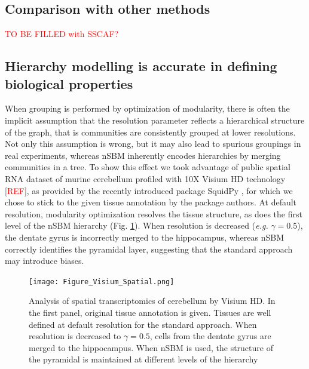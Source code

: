 \documentclass[10pt]{article}
\begin{document}
\subsection*{Comparison with other methods}

\textcolor{red}{TO BE FILLED with SSCAF?}


\subsection*{Hierarchy modelling is accurate in defining biological properties}

When grouping is performed by optimization of modularity, there is often the implicit assumption that the resolution parameter reflects a hierarchical structure of the graph, that is communities are consistently grouped at lower resolutions. Not only this assumption is wrong, but it may also lead to spurious groupings in real experiments, whereas nSBM inherently encodes hierarchies by merging communities in a tree. To show this effect we took advantage of public spatial RNA dataset of murine cerebellum profiled with 10X Visium HD technology [\textcolor{red}{REF}], as provided by the recently introduced package SquidPy \cite{Palla_Theis_2021}, for which we chose to stick to the given tissue annotation by the package authors. At default resolution, modularity optimization resolves the tissue structure, as does the first level of the nSBM hierarchy (Fig. \ref{Figure_Visium}). When resolution is decreased (\emph{e.g.} $\gamma = 0.5$), the dentate gyrus is incorrectly merged to the hippocampus, whereas nSBM correctly identifies the pyramidal layer, suggesting that the standard approach may introduce biases.

\begin{figure}[H]
\centering
\texttt{[image: Figure\_Visium\_Spatial.png]}
\caption[]{Analysis of spatial transcriptomics of cerebellum by Visium HD. In the first panel, original tissue annotation is given. Tissues are well defined at default resolution for the standard approach. When resolution is decreased to $\gamma = 0.5$, cells from the dentate gyrus are merged to the hippocampus. When nSBM is used, the structure of the pyramidal is maintained at different levels of the hierarchy}\label{Figure_Visium}
\end{figure}
\end{document}
